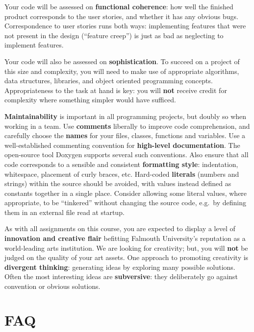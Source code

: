 \documentclass{../../fal_assignment}
\begin{document}
Your code will be assessed on \textbf{functional coherence}:
how well the finished product corresponds to the user stories,
and whether it has any obvious bugs.
Correspondence to user stories runs both ways:
implementing features that were not present in the design (``feature creep'')
is just as bad as neglecting to implement features.

Your code will also be assessed on \textbf{sophistication}.
To succeed on a project of this size and complexity,
you will need to make use of appropriate algorithms, data structures, libraries, and object oriented programming concepts.
Appropriateness to the task at hand is key:
you will \textbf{not} receive credit for complexity  
where something simpler would have sufficed.

\textbf{Maintainability} is important in all programming projects,
but doubly so when working in a team.
Use \textbf{comments} liberally to improve code comprehension,
and carefully choose the \textbf{names} for your files, classes, functions and variables.
Use a well-established commenting convention
for \textbf{high-level documentation}.
The open-source tool Doxygen supports several such conventions.
Also ensure that all code corresponds to a sensible and consistent \textbf{formatting style}:
indentation, whitespace, placement of curly braces, etc.
Hard-coded \textbf{literals} (numbers and strings) within the source should be avoided,
with values instead defined as constants together in a single place.
Consider allowing some literal values, where appropriate, to be ``tinkered'' without changing the source code,
e.g.\ by defining them in an external file read at startup.

As with all assignments on this course, you are expected to display a level of
\textbf{innovation and creative flair} befitting Falmouth University's reputation as a world-leading
arts institution.
We are looking for creativity; but, 
you will \textbf{not} be judged on the quality of your art assets.
One approach to promoting creativity is
\textbf{divergent thinking}: generating ideas by exploring many possible solutions.
Often the most interesting ideas are \textbf{subversive}: they deliberately go against
convention or obvious solutions.

\section*{FAQ}
\end{document}
